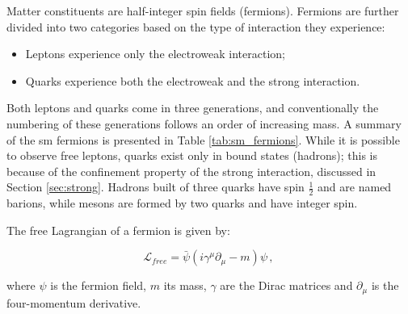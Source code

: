 Matter constituents are half-integer spin fields (fermions). Fermions are further divided into two categories based on the type of interaction they experience:
\begin{itemize}
\item Leptons experience only the electroweak interaction;
\item Quarks experience both the electroweak and the strong interaction.
\end{itemize}

Both leptons and quarks come in three generations, and conventionally the numbering of these generations follows an order of increasing mass. A summary of the \gls{sm} fermions is presented in Table \ref{tab:sm_fermions}. While it is possible to observe free leptons, quarks exist only in bound states (hadrons); this is because of the confinement property of the strong interaction, discussed in Section \ref{sec:strong}. Hadrons built of three quarks have spin $\frac{1}{2}$ and are named barions, while mesons are formed by two quarks and have integer spin.


The free Lagrangian of a fermion is given by:

\begin{equation}
 \mathcal{L}_{free} = \bar{\psi} \left( i \gamma^{\mu} \partial_{\mu} - m \right) \psi \, , \
 \label{eq:sm:dirac}
\end{equation}

\noindent where $\psi$ is the fermion field, $m$ its mass, $\gamma$ are the Dirac matrices and $\partial_{\mu}$ is the four-momentum derivative. 


